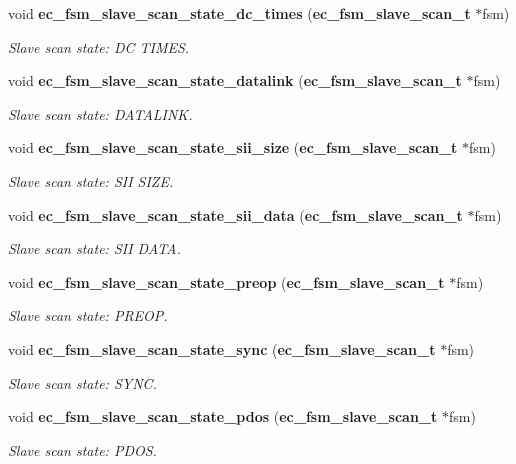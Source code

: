 \begin{DoxyCompactItemize}
void {\bf ec\-\_\-fsm\-\_\-slave\-\_\-scan\-\_\-state\-\_\-dc\-\_\-times} ({\bf ec\-\_\-fsm\-\_\-slave\-\_\-scan\-\_\-t} $\ast$fsm)
\begin{DoxyCompactList}\small\item\em Slave scan state\-: D\-C T\-I\-M\-E\-S. \end{DoxyCompactList}\item 
void {\bf ec\-\_\-fsm\-\_\-slave\-\_\-scan\-\_\-state\-\_\-datalink} ({\bf ec\-\_\-fsm\-\_\-slave\-\_\-scan\-\_\-t} $\ast$fsm)
\begin{DoxyCompactList}\small\item\em Slave scan state\-: D\-A\-T\-A\-L\-I\-N\-K. \end{DoxyCompactList}\item 
void {\bf ec\-\_\-fsm\-\_\-slave\-\_\-scan\-\_\-state\-\_\-sii\-\_\-size} ({\bf ec\-\_\-fsm\-\_\-slave\-\_\-scan\-\_\-t} $\ast$fsm)
\begin{DoxyCompactList}\small\item\em Slave scan state\-: S\-I\-I S\-I\-Z\-E. \end{DoxyCompactList}\item 
void {\bf ec\-\_\-fsm\-\_\-slave\-\_\-scan\-\_\-state\-\_\-sii\-\_\-data} ({\bf ec\-\_\-fsm\-\_\-slave\-\_\-scan\-\_\-t} $\ast$fsm)
\begin{DoxyCompactList}\small\item\em Slave scan state\-: S\-I\-I D\-A\-T\-A. \end{DoxyCompactList}\item 
void {\bf ec\-\_\-fsm\-\_\-slave\-\_\-scan\-\_\-state\-\_\-preop} ({\bf ec\-\_\-fsm\-\_\-slave\-\_\-scan\-\_\-t} $\ast$fsm)
\begin{DoxyCompactList}\small\item\em Slave scan state\-: P\-R\-E\-O\-P. \end{DoxyCompactList}\item 
void {\bf ec\-\_\-fsm\-\_\-slave\-\_\-scan\-\_\-state\-\_\-sync} ({\bf ec\-\_\-fsm\-\_\-slave\-\_\-scan\-\_\-t} $\ast$fsm)
\begin{DoxyCompactList}\small\item\em Slave scan state\-: S\-Y\-N\-C. \end{DoxyCompactList}\item 
void {\bf ec\-\_\-fsm\-\_\-slave\-\_\-scan\-\_\-state\-\_\-pdos} ({\bf ec\-\_\-fsm\-\_\-slave\-\_\-scan\-\_\-t} $\ast$fsm)
\begin{DoxyCompactList}\small\item\em Slave scan state\-: P\-D\-O\-S. \end{DoxyCompactList}\item 

\end{DoxyCompactItemize}
